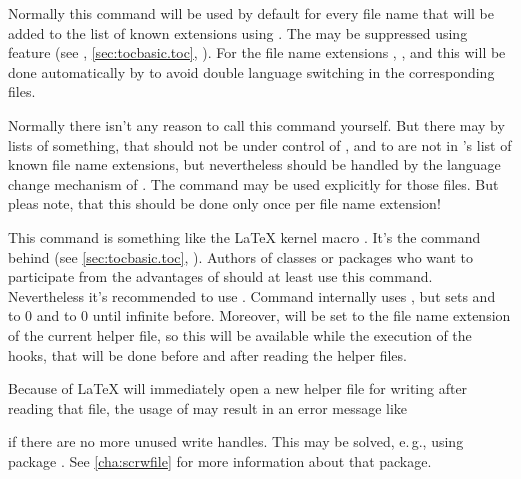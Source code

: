 Normally this command will be used by default for every file name
 that will be added to the list of known extensions using
. The may be suppressed using feature
 (see ,
\autoref{sec:tocbasic.toc}, ). For the
file name extensions , , and  this will be done
automatically by  to avoid double language switching in the
corresponding files.

Normally there isn't any reason to call this command yourself. But there may
by lists of something, that should not be under control of ,
and to are not in 's list of known file name extensions, but
nevertheless should be handled by the language change mechanism of
. The command may be used explicitly for those files. But pleas
note, that this should be done only once per file name extension!%
%

\begin{Declaration}
\end{Declaration}
This command is something like the \LaTeX{} kernel macro
.  It's the
command behind  (see \autoref{sec:tocbasic.toc},
). Authors of classes or packages
who want to participate from the advantages of  should at
least use this command. Nevertheless it's recommended to use
. Command  internally uses
\Macro{\@starttoc}, but sets
 and  to 0
and  to 0 until infinite before. Moreover,
 will be set to
the file name extension of the current helper file, so this will be available
while the execution of the hooks, that will be done before and after reading
the helper files.

Because of \LaTeX{} will immediately open a new helper
file for writing after reading that file, the usage of
 may result in an error message like
if there are no more unused write handles. This may be solved, e.\,g., using
package
.
See \autoref{cha:scrwfile} for more information about that package.%

